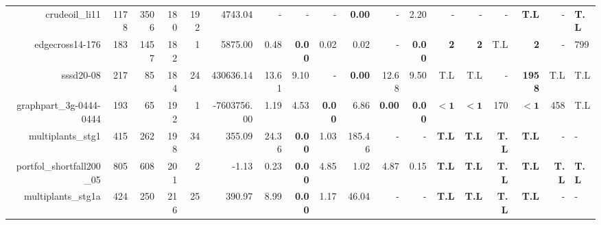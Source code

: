 \begin{table*}[t]
\begin{tabular}{|r|r|r|r|r||r||r|r|r|r|r||r|r|r|r|r|r|}
                    crudeoil\_li11 &         1178 &          3506 &          180 &           192 &             4743.04 &              - &              - &              - &  \textbf{0.00} &              - &           2.20 &                  - &                  - &                  - &       \textbf{T.L} &            - & \textbf{T.L} \\ 
                   edgecross14-176 &          183 &          1457 &          182 &             1 &             5875.00 &           0.48 &  \textbf{0.00} &           0.02 &           0.02 &              - &  \textbf{0.00} &         \textbf{2} &         \textbf{2} &                T.L &         \textbf{2} &            - &          799 \\ 
                         sssd20-08 &          217 &            85 &          184 &            24 &           430636.14 &          13.61 &           9.10 &              - &  \textbf{0.00} &          12.68 &           9.50 &                T.L &                T.L &                  - &      \textbf{1958} &          T.L &          T.L \\ 
           graphpart\_3g-0444-0444 &          193 &            65 &          192 &             1 &         -7603756.00 &           1.19 &           4.53 &  \textbf{0.00} &           6.86 &  \textbf{0.00} &  \textbf{0.00} &         $\bm{< 1}$ &         $\bm{< 1}$ &                170 &         $\bm{< 1}$ &          458 &          T.L \\ 
                 multiplants\_stg1 &          415 &           262 &          198 &            34 &              355.09 &          24.36 &  \textbf{0.00} &           1.03 &         185.46 &              - &              - &       \textbf{T.L} &       \textbf{T.L} &       \textbf{T.L} &       \textbf{T.L} &            - &            - \\ 
         portfol\_shortfall200\_05 &          805 &           608 &          201 &             2 &               -1.13 &           0.23 &  \textbf{0.00} &           4.85 &           1.02 &           4.87 &           0.15 &       \textbf{T.L} &       \textbf{T.L} &       \textbf{T.L} &       \textbf{T.L} & \textbf{T.L} & \textbf{T.L} \\ 
                multiplants\_stg1a &          424 &           250 &          216 &            25 &              390.97 &           8.99 &  \textbf{0.00} &           1.17 &          46.04 &              - &              - &       \textbf{T.L} &       \textbf{T.L} &       \textbf{T.L} &       \textbf{T.L} &            - &            - \\ 

\end{tabular}
\end{table*}
